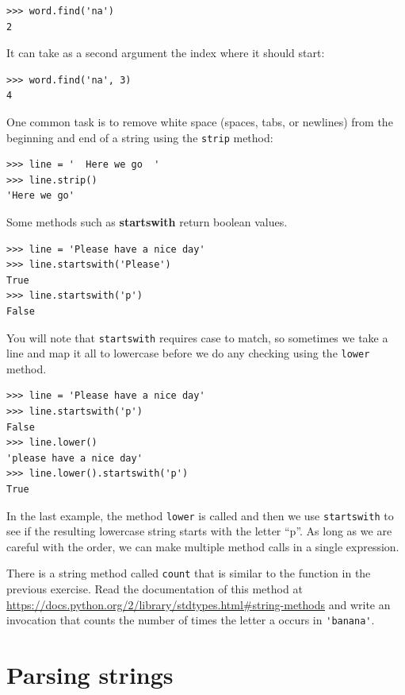 {\beforeverb
\begin{verbatim}
>>> word.find('na')
2
\end{verbatim}
\afterverb
%
It can take as a second argument the index where it should start:


\beforeverb
\begin{verbatim}
>>> word.find('na', 3)
4
\end{verbatim}
\afterverb
%
One common task is to remove white space (spaces, tabs, or newlines) from
the beginning and end of a string using the {\tt strip} method:

\beforeverb
\begin{verbatim}
>>> line = '  Here we go  '
>>> line.strip()
'Here we go'
\end{verbatim}
\afterverb
%
Some methods such as {\bf startswith} return boolean values.

\beforeverb
\begin{verbatim}
>>> line = 'Please have a nice day'
>>> line.startswith('Please')
True
>>> line.startswith('p')
False
\end{verbatim}
\afterverb
%
You will note that {\tt startswith} requires case to match, so sometimes
we take a line and map it all to lowercase before we do any checking
using the {\tt lower} method.

\beforeverb
\begin{verbatim}
>>> line = 'Please have a nice day'
>>> line.startswith('p')
False
>>> line.lower()
'please have a nice day'
>>> line.lower().startswith('p')
True
\end{verbatim}
\afterverb
%
In the last example, the method {\tt lower} is called
and then we use {\tt startswith}
to see if the resulting lowercase string
starts with the letter ``p''.  As long as we are careful
with the order, we can make multiple method calls in a
single expression.

\begin{ex}

There is a string method called {\tt count} that is similar
to the function in the previous exercise.  Read the documentation
of this method at
\url{https://docs.python.org/2/library/stdtypes.html#string-methods}
and write an invocation that counts the number of times the 
letter a  occurs
in \verb"'banana'".
\end{ex}

\section{Parsing strings}

}
